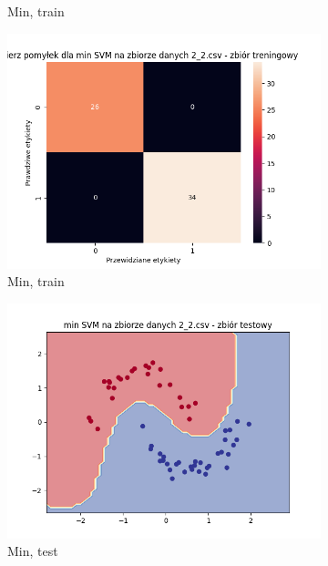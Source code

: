 \documentclass[12pt]{article}
\newcommand*{\subfigwidth}{0.24\textwidth}
\begin{document}
\begin{figure}[H]
\begin{subfigure}[t]{\subfigwidth}
        \caption{Min, train}
    \end{subfigure}
    \hfill
    \begin{subfigure}[t]{\subfigwidth}
        \includegraphics[width=\linewidth]{img/exp_3/svm/2_2/min/train_matrix.png}
        \caption{Min, train}
    \end{subfigure}
    \hfill
    \begin{subfigure}[t]{\subfigwidth}
        \includegraphics[width=\linewidth]{img/exp_3/svm/2_2/min/test_boundary.png}
        \caption{Min, test}
    \end{subfigure}
    \hfill
    \begin{subfigure}[t]{\subfigwidth}

\end{subfigure}
\end{figure}
\end{document}
